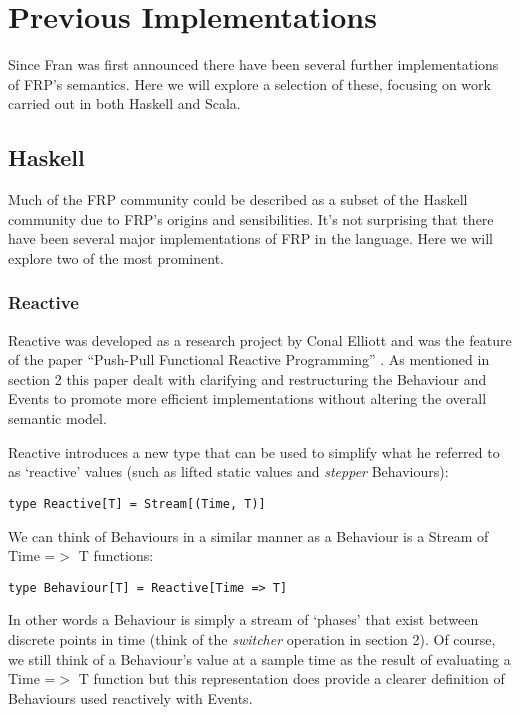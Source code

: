 \chapter{Previous Implementations}
  Since Fran was first announced there have been several further implementations of FRP's semantics. Here
  we will explore a selection of these, focusing on work carried out in both Haskell and Scala.
  
  \section{Haskell}
    Much of the FRP community could be described as a subset of the Haskell community due to FRP's
    origins and sensibilities. It's not surprising that there have been several major implementations
    of FRP in the language. Here we will explore two of the most prominent.
    
    \subsection{Reactive}
      Reactive was developed as a research project by Conal Elliott and was the feature
      of the paper ``Push-Pull Functional Reactive Programming'' \cite{Elliott2009}. As mentioned
      in section 2 this paper dealt with clarifying and restructuring the Behaviour and Events
      to promote more efficient implementations without altering the overall semantic model.
      
      Reactive introduces a new type that can be used to simplify what he referred to as
      `reactive' values (such as lifted static values and \emph{stepper} Behaviours):
    
\begin{verbatim}
type Reactive[T] = Stream[(Time, T)]
\end{verbatim}

      We can think of Behaviours in a similar manner as a Behaviour is
      a Stream of Time =$>$ T functions:
      
\begin{verbatim}
type Behaviour[T] = Reactive[Time => T]
\end{verbatim}      

      In other words a Behaviour is simply a stream of `phases' that exist between discrete
      points in time (think of the \emph{switcher} operation in section 2). Of course, we
      still think of a Behaviour's value at a sample time as the result of evaluating a
      Time =$>$ T function but this representation
      does provide a clearer definition of Behaviours used reactively with Events.
      
